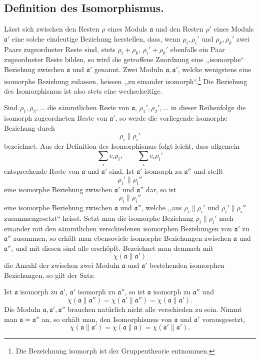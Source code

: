 \documentclass[11pt,a4paper]{article}
\begin{document}
\subsection*{Definition des Isomorphismus.}

Lässt sich zwischen den Resten $\rho$ eines Moduls $\mathfrak a$ und den Resten $\rho'$ eines Moduls $\mathfrak a'$ eine solche eindeutige Beziehung herstellen, dass, wenn $\rho_i,\rho_i'$ und $\rho_k,\rho_k'$ zwei Paare zugeordneter Reste sind, stets $\rho_i+\rho_k$, $\rho_i'+\rho_k'$ ebenfalls ein Paar zugeordneter Reste bilden, so wird die getroffene Zuordnung eine ,,isomorphe`` Beziehung zwischen $\mathfrak a$ und $\mathfrak a'$ genannt. Zwei Moduln $\mathfrak a,\mathfrak a'$, welche wenigstens eine isomorphe Beziehung zulassen, heissen ,,zu einander isomorph``.\footnote{Die Bezeichnung isomorph ist der Gruppentheorie entnommen.} Die Beziehung des Isomorphismus ist also stets eine wechselseitige.

Sind $\rho_1,\rho_2,\ldots$ die sämmtlichen Reste von $\mathfrak a$, $\rho_1',\rho_2',\ldots$ in dieser Reihenfolge die isomorph zugeordneten Reste von $\mathfrak a'$, so werde die vorliegende isomorphe Beziehung durch
\[
 \rho_i\parallel \rho_i'
\]
bezeichnet. Aus der Definition des Isomorphismus folgt leicht, dass allgemein
\[
 \sum_i c_i\rho_i,
 \qquad
 \sum_i c_i\rho_i'
\]
entsprechende Reste von $\mathfrak a$ und $\mathfrak a'$ sind. Ist $\mathfrak a'$ isomorph zu $\mathfrak a''$ und stellt
\[
 \rho_i'\parallel \rho_i''
\]
eine isomorphe Beziehung zwischen $\mathfrak a'$ und $\mathfrak a''$ dar, so ist
\[
 \rho_i\parallel \rho_i''
\]
eine isomorphe Beziehung zwischen $\mathfrak a$ und $\mathfrak a''$, welche ,,aus $\rho_i\parallel\rho_i'$ und $\rho_i'\parallel\rho_i''$ zusammengesetzt`` heisst. Setzt man die isomorphe Beziehung $\rho_i\parallel\rho_i'$ nach einander mit den sämmtlichen verschiedenen isomorphen Beziehungen von $\mathfrak a'$ zu $\mathfrak a''$ zusammen, so erhält man ebensoviele isomorphe Beziehungen zwischen $\mathfrak a$ und $\mathfrak a''$, und mit diesen sind alle erschöpft. Bezeichnet man demnach mit
\[
 \chi(\mathfrak a\parallel\mathfrak a')
\]
die Anzahl der zwischen zwei Moduln $\mathfrak a$ und $\mathfrak a'$ bestehenden isomorphen Beziehungen, so gilt der Satz:

Ist $\mathfrak a$ isomorph zu $\mathfrak a'$, $\mathfrak a'$ isomorph zu $\mathfrak a''$, so ist $\mathfrak a$ isomorph zu $\mathfrak a''$ und
\[
 \chi(\mathfrak a\parallel\mathfrak a'')=
 \chi(\mathfrak a'\parallel\mathfrak a'')=
 \chi(\mathfrak a\parallel\mathfrak a').
\]
Die Moduln $\mathfrak a,\mathfrak a',\mathfrak a''$ brauchen natürlich nicht alle verschieden zu sein. Nimmt man $\mathfrak a=\mathfrak a''$ an, so erhält man, den Isomorphismus von $\mathfrak a$ und $\mathfrak a'$ vorausgesetzt,
\[
 \chi(\mathfrak a\parallel\mathfrak a')=
 \chi(\mathfrak a\parallel\mathfrak a)=
 \chi(\mathfrak a'\parallel\mathfrak a').
\]
\end{document}
